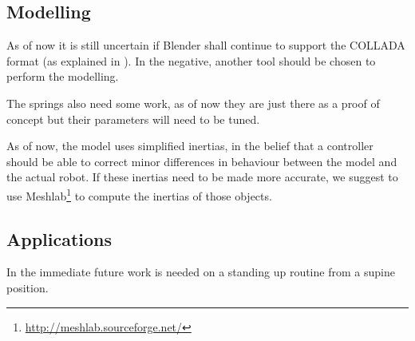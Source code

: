 \subsection{Modelling}
As of now it is still uncertain if Blender shall continue to support the COLLADA format (as explained in \cite{blender_roadmap}). In the negative, another tool should be chosen to perform the modelling.

The springs also need some work, as of now they are just there as a proof of concept but their parameters will need to be tuned.

As of now, the model uses simplified inertias, in the belief that a controller should be able to correct minor differences in behaviour between the model and the actual robot. If these inertias need to be made more accurate, we suggest to use Meshlab\footnote{\url{http://meshlab.sourceforge.net/}} to compute the inertias of those objects.

\subsection{Applications}
In the immediate future work is needed on a standing up routine from a supine position.

